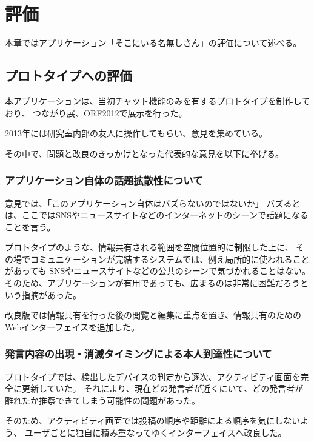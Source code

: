 \chapter{評価}\label{chap:hyoka}

本章ではアプリケーション「そこにいる名無しさん」の評価について述べる。

\newpage

\section{プロトタイプへの評価}

本アプリケーションは、当初チャット機能のみを有するプロトタイプを制作しており、
つながり展、ORF2012で展示を行った。

2013年には研究室内部の友人に操作してもらい、意見を集めている。

その中で、問題と改良のきっかけとなった代表的な意見を以下に挙げる。

\subsection{アプリケーション自体の話題拡散性について}

意見では、「このアプリケーション自体はバズらないのではないか」
バズるとは、ここではSNSやニュースサイトなどのインターネットのシーンで話題になることを言う。

プロトタイプのような、情報共有される範囲を空間位置的に制限した上に、
その場でコミュニケーションが完結するシステムでは、例え局所的に使われることがあっても
SNSやニュースサイトなどの公共のシーンで気づかれることはない。
そのため、アプリケーションが有用であっても、広まるのは非常に困難だろうという指摘があった。

改良版では情報共有を行った後の閲覧と編集に重点を置き、情報共有のためのWebインターフェイスを追加した。

\subsection{発言内容の出現・消滅タイミングによる本人到達性について}

プロトタイプでは、検出したデバイスの判定から逐次、アクティビティ画面を完全に更新していた。
それにより、現在どの発言者が近くにいて、どの発言者が離れたか推察できてしまう可能性の問題があった。

そのため、アクティビティ画面では投稿の順序や距離による順序を気にしないよう、
ユーザごとに独自に積み重なってゆくインターフェイスへ改良した。
